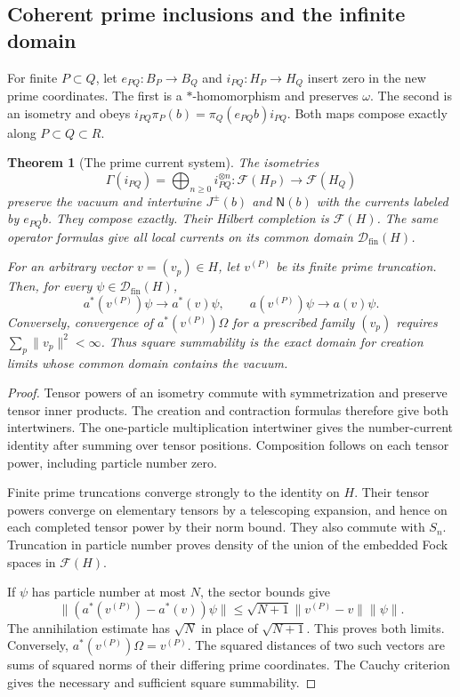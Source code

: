 \documentclass[11pt]{article}
\newtheorem{theorem}{Theorem}[section]
\theoremstyle{definition}
\theoremstyle{remark}
\numberwithin{equation}{section}
\begin{document}
\subsection{Coherent prime inclusions and the infinite domain}

For finite $P\subset Q$, let $e_{PQ}:B_P\to B_Q$ and
$i_{PQ}:H_P\to H_Q$ insert zero in the new prime coordinates.
The first is a $*$-homomorphism and preserves $\omega$.
The second is an isometry and obeys
$i_{PQ}\pi_P(b)=\pi_Q(e_{PQ}b)i_{PQ}$.
Both maps compose exactly along $P\subset Q\subset R$.

\begin{theorem}[The prime current system]
\label{thm:wc-system}
The isometries
\[
 \Gamma(i_{PQ})=\bigoplus_{n\geq0}i_{PQ}^{\otimes n}:
 \mathcal F(H_P)\longrightarrow\mathcal F(H_Q)
\]
preserve the vacuum and intertwine $J^\pm(b)$ and $\mathsf N(b)$
with the currents labeled by $e_{PQ}b$.
They compose exactly.  Their Hilbert completion is $\mathcal F(H)$.
The same operator formulas give all local currents on its common
domain $\mathcal D_{\mathrm{fin}}(H)$.

For an arbitrary vector $v=(v_p)\in H$, let $v^{(P)}$ be its finite
prime truncation.  Then, for every $\psi\in\mathcal D_{\mathrm{fin}}(H)$,
\begin{equation}
 a^*(v^{(P)})\psi\longrightarrow a^*(v)\psi,\qquad
 a(v^{(P)})\psi\longrightarrow a(v)\psi.
 \label{eq:wc-infinite-currents}
\end{equation}
Conversely, convergence of $a^*(v^{(P)})\Omega$ for a prescribed family
$(v_p)$ requires $\sum_p\|v_p\|^2<\infty$.
Thus square summability is the exact domain for creation limits
whose common domain contains the vacuum.
\end{theorem}
\begin{proof}
Tensor powers of an isometry commute with symmetrization and preserve
tensor inner products.  The creation and contraction formulas therefore
give both intertwiners.  The one-particle multiplication intertwiner
gives the number-current identity after summing over tensor positions.
Composition follows on each tensor power, including particle number zero.

Finite prime truncations converge strongly to the identity on $H$.
Their tensor powers converge on elementary tensors by a telescoping
expansion, and hence on each completed tensor power by their norm bound.
They also commute with $S_n$.
Truncation in particle number proves density of the union of the embedded
Fock spaces in $\mathcal F(H)$.

If $\psi$ has particle number at most $N$, the sector bounds give
\[
 \|(a^*(v^{(P)})-a^*(v))\psi\|
 \leq\sqrt{N+1}\|v^{(P)}-v\|\|\psi\|.
\]
The annihilation estimate has $\sqrt N$ in place of $\sqrt{N+1}$.
This proves both limits.  Conversely,
$a^*(v^{(P)})\Omega=v^{(P)}$.
The squared distances of two such vectors are sums of squared norms
of their differing prime coordinates.  The Cauchy criterion gives the
necessary and sufficient square summability.
\end{proof}
\end{document}
